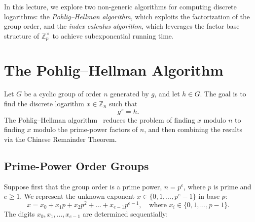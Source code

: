 
In this lecture, we explore two non-generic algorithms for computing discrete logarithms: the \emph{Pohlig--Hellman algorithm}, which exploits the factorization of the group order, and the \emph{index calculus algorithm}, which leverages the factor base structure of \(\mathbb{Z}_p^\times\) to achieve subexponential running time.

\section*{The Pohlig--Hellman Algorithm}

Let \(G\) be a cyclic group of order \(n\) generated by \(g\), and let \(h \in G\).
The goal is to find the discrete logarithm \(x \in \mathbb{Z}_n\) such that
\[
    g^x = h.
\]
The Pohlig--Hellman algorithm~\cite{PohligHellman1978} reduces the problem of finding \(x\) modulo \(n\) to finding \(x\) modulo the prime-power factors of \(n\), and then combining the results via the Chinese Remainder Theorem.

\subsection*{Prime-Power Order Groups}

Suppose first that the group order is a prime power, \(n = p^e\), where \(p\) is prime and \(e \geq 1\).
We represent the unknown exponent \(x \in \{0, 1, \dots, p^e - 1\}\) in base \(p\):
\[
    x = x_0 + x_1 p + x_2 p^2 + \dots + x_{e-1} p^{e-1}, \quad \text{where } x_i \in \{0, 1, \dots, p-1\}.
\]
The digits \(x_0, x_1, \dots, x_{e-1}\) are determined sequentially:

